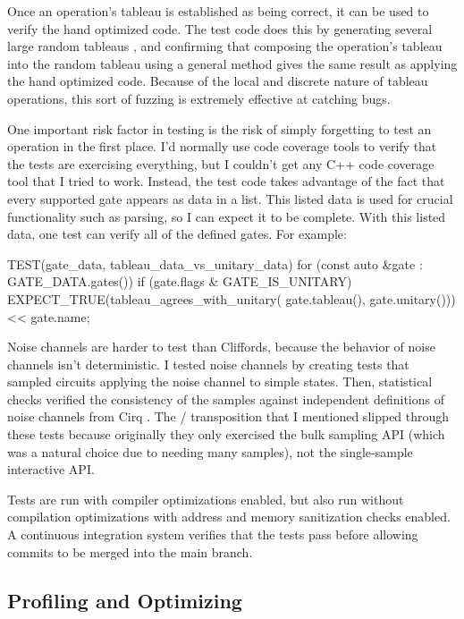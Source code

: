 \documentclass[onecolumn,unpublished]{quantumarticle}
\theoremstyle{definition}
\theoremstyle{definition}
\theoremstyle{definition}
\begin{document}
Once an operation's tableau is established as being correct, it can be used to verify the hand optimized code.
The test code does this by generating several large random tableaus \cite{bravyi2020randomtableau}, and confirming that composing the operation's tableau into the random tableau using a general method gives the same result as applying the hand optimized code.
Because of the local and discrete nature of tableau operations, this sort of fuzzing is extremely effective at catching bugs.

One important risk factor in testing is the risk of simply forgetting to test an operation in the first place.
I'd normally use code coverage tools to verify that the tests are exercising everything, but I couldn't get any C++ code coverage tool that I tried to work.
Instead, the test code takes advantage of the fact that every supported gate appears as data in a list.
This listed data is used for crucial functionality such as parsing, so I can expect it to be complete.
With this listed data, one test can verify all of the defined gates.
For example:

\begin{cpp}
    TEST(gate_data, tableau_data_vs_unitary_data) {
        for (const auto &gate : GATE_DATA.gates()) {
            if (gate.flags & GATE_IS_UNITARY) {
                EXPECT_TRUE(tableau_agrees_with_unitary(
                    gate.tableau(), gate.unitary())) << gate.name;
            }
        }
    }
\end{cpp}

Noise channels are harder to test than Cliffords, because the behavior of noise channels isn't deterministic.
I tested noise channels by creating tests that sampled circuits applying the noise channel to simple states.
Then, statistical checks verified the consistency of the samples against independent definitions of noise channels from Cirq \cite{quantum_ai_team_and_collaborators_2020_4062499}.
The / transposition that I mentioned slipped through these tests because originally they only exercised the bulk sampling API (which was a natural choice due to needing many samples), not the single-sample interactive API.

Tests are run with compiler optimizations enabled, but also run without compilation optimizations with address and memory sanitization checks enabled.
A continuous integration system verifies that the tests pass before allowing commits to be merged into the main branch.

\subsection{Profiling and Optimizing}
\end{document}
